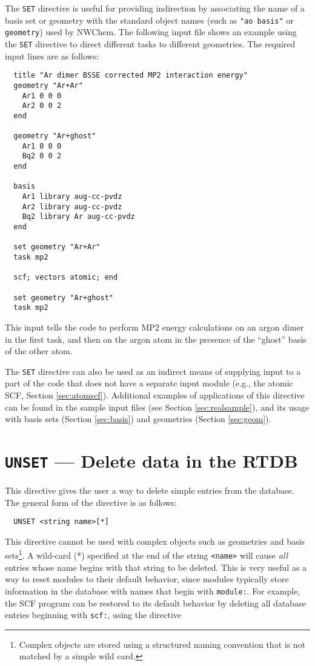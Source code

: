 The \verb+SET+ directive is useful for providing indirection by
associating the name of a basis set or geometry with the standard
object names (such as \verb+"ao basis"+ or \verb+geometry+) used by
NWChem.  The following input file shows an example using the
\verb+SET+ directive to direct different tasks to different
geometries.  The required input lines are as follows:

\begin{verbatim}
  title "Ar dimer BSSE corrected MP2 interaction energy"
  geometry "Ar+Ar"
    Ar1 0 0 0
    Ar2 0 0 2
  end

  geometry "Ar+ghost"
    Ar1 0 0 0
    Bq2 0 0 2
  end

  basis
    Ar1 library aug-cc-pvdz
    Ar2 library aug-cc-pvdz
    Bq2 library Ar aug-cc-pvdz
  end

  set geometry "Ar+Ar"
  task mp2 

  scf; vectors atomic; end

  set geometry "Ar+ghost"
  task mp2 
\end{verbatim}

This input tells the code to perform MP2 energy calculations 
on an argon dimer in the first task, and then
on the argon atom in the presence of the ``ghost'' basis of the other
atom.

The \verb+SET+ directive can also be used as an indirect means of
supplying input to a part of the code that does not have a separate
input module (e.g., the atomic SCF, Section \ref{sec:atomscf}).
Additional examples of applications of this directive can be found in
the sample input files (see Section \ref{sec:realsample}), and
its usage with basis sets (Section \ref{sec:basis}) and geometries
(Section \ref{sec:geom}).

\section{{\tt UNSET} --- Delete data in the RTDB}
\label{sec:unset}

This directive gives the user a way to delete simple entries from the
database.  The general form of the directive is as follows:

\begin{verbatim}
  UNSET <string name>[*]
\end{verbatim}

This directive cannot be used with complex objects such as geometries
and basis sets\footnote{Complex objects are stored using a structured
  naming convention that is not matched by a simple wild card.}.  A
wild-card (*) specified at the end of the string \verb+<name>+ will
cause {\em all} entries whose name begins with that string to be
deleted.  This is very useful as a way to reset modules to their
default behavior, since modules typically store information in the
database with names that begin with \verb+module:+.  For example, the
SCF program can be restored to its default behavior by deleting all
database entries beginning with \verb+scf:+, using the directive

